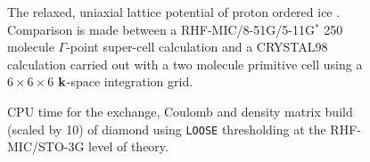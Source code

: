 \commentoutA{\documentclass[prb,aps,nobibnotes,twocolumn,doublespace,twocolumngrid,superbib,showpacs]{revtex4}}
\begin{document}
{\clearpage
\begin{figure}
\caption{The relaxed, uniaxial lattice potential of proton ordered ice \cite{SCasassa97}.
Comparison is made between a RHF-MIC/8-51G/5-11G$^*$ 250 molecule $\Gamma$-point super-cell 
calculation and a {\sc CRYSTAL98} calculation carried out with a two molecule primitive
cell using a~$6\times6\times6$ ${\bf k}$-space integration grid.}
\label{IceEnergyVsLattice}
{\center {} \par}
\end{figure}

\clearpage
\begin{figure}
\caption{CPU time for the exchange, Coulomb  and density 
matrix build (scaled by 10) of diamond using {\tt LOOSE} thresholding 
at the RHF-MIC/STO-3G level of theory.}
\label{DiamondScaling_1}
{\centering  {} \par}
\end{figure}

}
\end{document}

